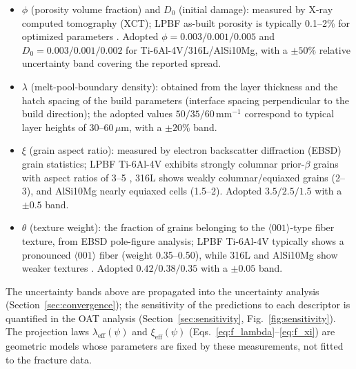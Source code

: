 \documentclass[12pt,a4paper,twocolumn]{article}
\begin{document}
\begin{itemize}
    \item $\phi$ (porosity volume fraction) and $D_0$ (initial damage): measured by X-ray computed tomography (XCT); LPBF as-built porosity is typically 0.1--2\% for optimized parameters \cite{liu2022phase}. Adopted $\phi = 0.003/0.001/0.005$ and $D_0 = 0.003/0.001/0.002$ for Ti-6Al-4V/316L/AlSi10Mg, with a $\pm50\%$ relative uncertainty band covering the reported spread.
    \item $\lambda$ (melt-pool-boundary density): obtained from the layer thickness and the hatch spacing of the build parameters (interface spacing perpendicular to the build direction); the adopted values $50/35/60$\,mm$^{-1}$ correspond to typical layer heights of 30--60\,$\mu$m, with a $\pm20\%$ band.
    \item $\xi$ (grain aspect ratio): measured by electron backscatter diffraction (EBSD) grain statistics; LPBF Ti-6Al-4V exhibits strongly columnar prior-$\beta$ grains with aspect ratios of 3--5 \cite{carroll2015anisotropic}, 316L shows weakly columnar/equiaxed grains (2--3), and AlSi10Mg nearly equiaxed cells (1.5--2). Adopted $3.5/2.5/1.5$ with a $\pm0.5$ band.
    \item $\theta$ (texture weight): the fraction of grains belonging to the $\langle001\rangle$-type fiber texture, from EBSD pole-figure analysis; LPBF Ti-6Al-4V typically shows a pronounced $\langle001\rangle$ fiber (weight 0.35--0.50), while 316L and AlSi10Mg show weaker textures \cite{carroll2015anisotropic,jaskari2021materials_316l}. Adopted $0.42/0.38/0.35$ with a $\pm0.05$ band.
\end{itemize}

The uncertainty bands above are propagated into the uncertainty analysis (Section~\ref{sec:convergence}); the sensitivity of the predictions to each descriptor is quantified in the OAT analysis (Section~\ref{sec:sensitivity}, Fig.~\ref{fig:sensitivity}). The projection laws $\lambda_{\mathrm{eff}}(\psi)$ and $\xi_{\mathrm{eff}}(\psi)$ (Eqs.~\eqref{eq:f_lambda}--\eqref{eq:f_xi}) are geometric models whose parameters are fixed by these measurements, not fitted to the fracture data.
\end{document}
